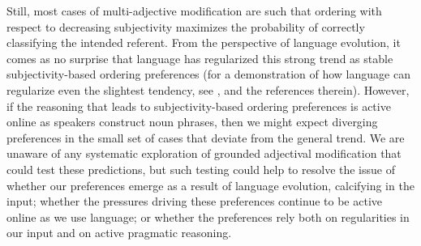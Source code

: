 \documentclass[preprint,authoryear]{elsarticle}\frenchspacing
\newcommand{\gcs}[1]{\textcolor{blue}{[gcs: #1]}}
\begin{document}
Still, most cases of multi-adjective modification are such that ordering with respect to decreasing subjectivity maximizes the probability of correctly classifying the intended referent. From the perspective of language evolution, it comes as no surprise that language has regularized this strong trend as stable subjectivity-based ordering preferences (for a demonstration of how language can regularize even the slightest tendency, see \citealp{kirby2017}, and the references therein). However, if the reasoning that leads to subjectivity-based ordering preferences is active online as speakers construct noun phrases, then we might expect diverging preferences in the small set of cases that deviate from the general trend. We are unaware of any systematic exploration of grounded adjectival modification that could test these predictions, but such testing could help to resolve the issue of whether our preferences emerge as a result of language evolution, calcifying in the input; whether the pressures driving these preferences continue to be active online as we use language; or whether the preferences rely both on regularities in our input and on active pragmatic reasoning.
 
\end{document}
